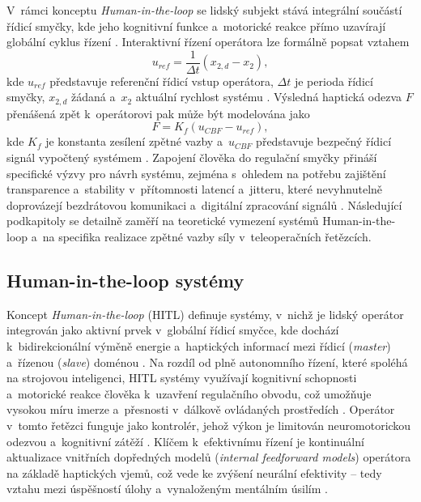 V~rámci konceptu \textit{Human-in-the-loop} se lidský subjekt stává integrální součástí řídicí smyčky, kde jeho kognitivní funkce a~motorické reakce přímo uzavírají globální cyklus řízení \cite{Aijaz2018, Thomas2023110, Zhang2021530}.
Interaktivní řízení operátora lze formálně popsat vztahem
%
\begin{equation}
    u_{ref} = \frac{1}{\Delta t}\left(x_{2,d} - x_2\right),
\end{equation}
%
kde $u_{ref}$ představuje referenční řídicí vstup operátora, $\Delta t$ je perioda řídicí smyčky, $x_{2,d}$ žádaná a~$x_2$ aktuální rychlost systému \cite{Zhang2021530}.
Výsledná haptická odezva $F$ přenášená zpět k~operátorovi pak může být modelována jako
%
\begin{equation}
    F = K_f \left(u_{CBF} - u_{ref}\right),
\end{equation}
%
kde $K_f$ je konstanta zesílení zpětné vazby a~$u_{CBF}$ představuje bezpečný řídicí signál vypočtený systémem \cite{Zhang2021530}.
Zapojení člověka do regulační smyčky přináší specifické výzvy pro návrh systému, zejména s~ohledem na potřebu zajištění transparence a~stability v~přítomnosti latencí a~jitteru, které nevyhnutelně doprovázejí bezdrátovou komunikaci a~digitální zpracování signálů \cite{Bolarinwa2022, Papakonstantinou20251218, Suman2025}.
Následující podkapitoly se detailně zaměří na teoretické vymezení systémů Human-in-the-loop a~na specifika realizace zpětné vazby síly v~teleoperačních řetězcích.

\subsection{Human-in-the-loop systémy}
Koncept \textit{Human-in-the-loop} (HITL) definuje systémy, v~nichž je lidský operátor integrován jako aktivní prvek v~globální řídicí smyčce, kde dochází k~bidirekcionální výměně energie a~haptických informací mezi řídicí (\textit{master}) a~řízenou (\textit{slave}) doménou \cite{Aijaz2018, Xiong2024}.
Na rozdíl od plně autonomního řízení, které spoléhá na strojovou inteligenci, HITL systémy využívají kognitivní schopnosti a~motorické reakce člověka k~uzavření regulačního obvodu, což umožňuje vysokou míru imerze a~přesnosti v~dálkově ovládaných prostředích \cite{Aijaz2018, Thomas2023110, Zhang2021530}.
Operátor v~tomto řetězci funguje jako kontrolér, jehož výkon je limitován neuromotorickou odezvou a~kognitivní zátěží \cite{Suman2025, Thomas2023110}.
Klíčem k~efektivnímu řízení je kontinuální aktualizace vnitřních dopředných modelů (\textit{internal feedforward models}) operátora na základě haptických vjemů, což vede ke zvýšení neurální efektivity -- tedy vztahu mezi úspěšností úlohy a~vynaloženým mentálním úsilím \cite{Thomas2023110, GIUDICI2025}.

